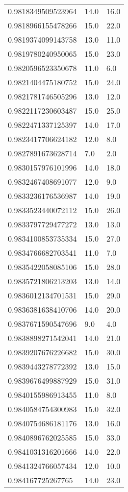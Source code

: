 \begin{center}
\begin{supertabular}[H]{p{0.30\textwidth}p{0.05\textwidth}p{0.05\textwidth}}
0.9818349509523964 & 14.0 & 16.0 \\ 
0.9818966155478266 & 15.0 & 22.0 \\ 
0.9819374099143758 & 13.0 & 11.0 \\ 
0.9819780240950065 & 15.0 & 23.0 \\ 
0.9820596523350678 & 11.0 & 6.0 \\ 
0.9821404475180752 & 15.0 & 24.0 \\ 
0.9821781746505296 & 13.0 & 12.0 \\ 
0.9822117230603487 & 15.0 & 25.0 \\ 
0.9822471337125397 & 14.0 & 17.0 \\ 
0.9823417706624182 & 12.0 & 8.0 \\ 
0.9827891673628714 & 7.0 & 2.0 \\ 
0.9830157976101996 & 14.0 & 18.0 \\ 
0.9832467408691077 & 12.0 & 9.0 \\ 
0.9833236176536987 & 14.0 & 19.0 \\ 
0.9833523440072112 & 15.0 & 26.0 \\ 
0.9833797729477272 & 13.0 & 13.0 \\ 
0.9834100853735334 & 15.0 & 27.0 \\ 
0.9834766682703541 & 11.0 & 7.0 \\ 
0.9835422058085106 & 15.0 & 28.0 \\ 
0.9835721806213203 & 13.0 & 14.0 \\ 
0.9836012134701531 & 15.0 & 29.0 \\ 
0.9836381638410706 & 14.0 & 20.0 \\ 
0.9837671590547696 & 9.0 & 4.0 \\ 
0.9838898271542041 & 14.0 & 21.0 \\ 
0.9839207676226682 & 15.0 & 30.0 \\ 
0.9839443278772392 & 13.0 & 15.0 \\ 
0.9839676499887929 & 15.0 & 31.0 \\ 
0.9840155986913455 & 11.0 & 8.0 \\ 
0.9840584754300983 & 15.0 & 32.0 \\ 
0.9840754686181176 & 13.0 & 16.0 \\ 
0.9840896762025585 & 15.0 & 33.0 \\ 
0.9841031316201666 & 14.0 & 22.0 \\ 
0.9841324766057434 & 12.0 & 10.0 \\ 
0.984167725267765 & 14.0 & 23.0 \\ 

\end{supertabular}
\end{center}
